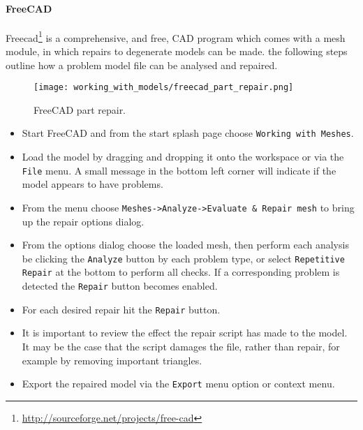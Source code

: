 {}

\paragraph{FreeCAD} %
\label{par:freecad}

Freecad\footnote{\url{http://sourceforge.net/projects/free-cad}} is a comprehensive, and free, CAD program which comes with a mesh module, in which repairs to degenerate models can be made.  the following steps outline how a problem model file can be analysed and repaired.

\begin{figure}[H]
\centering
\texttt{[image: working\_with\_models/freecad\_part\_repair.png]}
\caption{FreeCAD part repair.}
\label{fig:freecad_part_repair}
\end{figure}

\begin{itemize}
	\item Start FreeCAD and from the start splash page choose \texttt{Working with Meshes}.  
	\item Load the model by dragging and dropping it onto the workspace or via the \texttt{File} menu.  A small message in the bottom left corner will indicate if the model appears to have problems.
	\item From the menu choose \texttt{Meshes->Analyze->Evaluate \& Repair mesh} to bring up the repair options dialog.
	\item From the options dialog choose the loaded mesh, then perform each analysis be clicking the \texttt{Analyze} button by each problem type, or select \texttt{Repetitive Repair} at the bottom to perform all checks.  If a corresponding problem is detected the \texttt{Repair} button becomes enabled.
	\item For each desired repair hit the \texttt{Repair} button.  
	\item It is important to review the effect the repair script has made to the model.  It may be the case that the script damages the file, rather than repair, for example by removing important triangles.
	\item Export the repaired model via the \texttt{Export} menu option or context menu.
\end{itemize}

